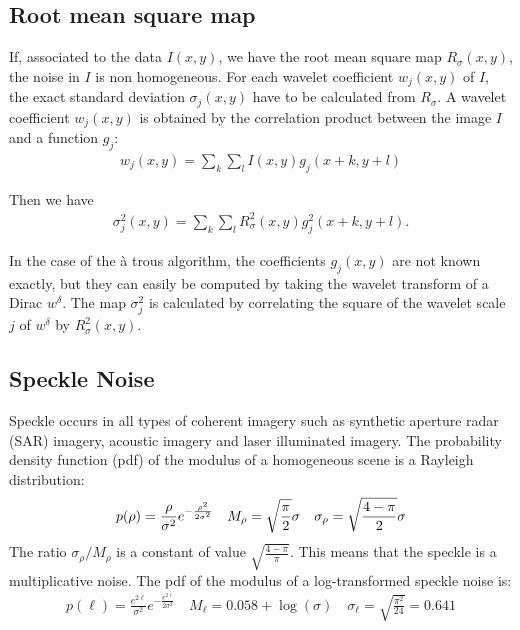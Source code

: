 \subsection*{Root mean square map}
If, associated to the data $I(x,y)$, we have the root mean square map  
$R_{\sigma}(x,y)$, the noise in $I$  is non homogeneous.
For each wavelet coefficient $w_j(x,y)$ of $I$, the 
exact standard deviation $\sigma_j(x,y)$ have to be calculated from 
 $R_{\sigma}$. A wavelet coefficient $w_j(x,y)$ is obtained by
the correlation product between the image $I$ and a function 
$g_j$:
\begin{eqnarray}
 w_j(x,y) = \sum_k \sum_l I(x,y)  g_j(x+k,y+l)
\end{eqnarray}

 
Then we have
\begin{eqnarray}
\sigma_j^2(x,y) =  \sum_k \sum_l R_{\sigma}^2(x,y) g_j^2(x+k,y+l).
\end{eqnarray}

In the case of the \`a trous algorithm, the coefficients $g_j(x,y)$
 are not known exactly, but they can easily be computed by taking the
wavelet transform of a Dirac $w^{\delta}$. The map $\sigma_j^2$ is calculated 
by correlating the square of the wavelet scale $j$ of  $w^{\delta}$
by $R^2_\sigma(x,y)$.
 
\subsection*{Speckle Noise}
Speckle occurs in all types of coherent imagery such as synthetic aperture
 radar (SAR) imagery,  acoustic imagery and laser illuminated imagery. 
 The probability density function (pdf) of the modulus of a homogeneous
 scene is a Rayleigh distribution:
\begin{eqnarray*}
p(\rho)={\rho\over \sigma^2}e^{-{\rho^2\over 2\sigma^2}} 
\quad  M_{\rho} = \sqrt{ \frac{\pi}{2} } \sigma \quad \sigma_{\rho}=\sqrt {\frac{4-\pi}{2}}\sigma
 \end{eqnarray*}
The ratio $\sigma_{\rho}/M_{\rho}$ is a constant of value $\sqrt{\frac{4-\pi}{\pi}}$.
This 
means that the speckle is a multiplicative noise. The pdf of the  modulus of a log-transformed 
 speckle noise is:
\begin{eqnarray*}
p(\ell) =  \frac{e^{2\ell}}{ \sigma^2} e^{-\frac{e^{2\ell}}{2 \sigma^2} } \quad 
M_{\ell} = 0.058 + \log(\sigma) \quad \sigma_{\ell}= \sqrt{\frac{\pi^2}{24}} = 0.641
\end{eqnarray*}

